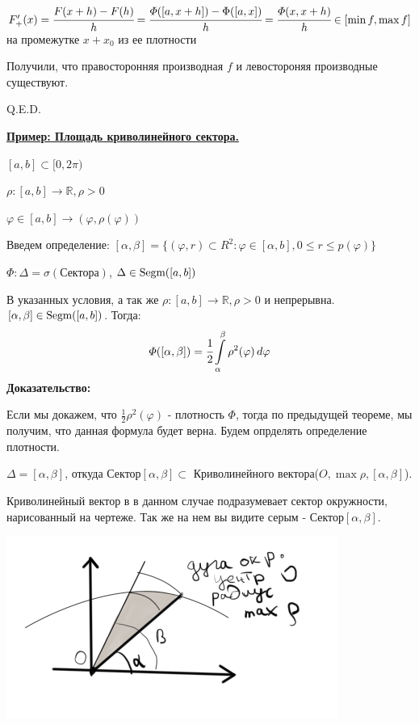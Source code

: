 $F'_{+}(x) = \cfrac{F(x+h)-F(h)}{h} = \cfrac{\varPhi([a, x +h])-\Phi([a,x])}{h} = \cfrac{\varPhi(x,x+h)}{h}\in [\min f, \max f]$ на промежутке $x+x_0$ из ее плотности  

Получили, что правосторонняя производная $f$ и левостороняя производные существуют.

\hfill Q.E.D.



\uline{\textbf{Пример: Площадь криволинейного сектора.} }

$[a,b] \subset [0,2\pi)$

$\rho:[a,b]\rightarrow \mathbb{R}, \rho>0$

$\varphi \in [a,b] \rightarrow (\varphi,\rho(\varphi))$

Введем определение:  $[\alpha,\beta] = \{(\varphi,r)\subset R^2: \varphi\in[\alpha,b], 0\leq r\leq p(\varphi)\}$

$\varPhi: \Delta = \sigma(\text{Сектора}) $, $\Delta \in \text{Segm}([a,b])$



В указанных условия, а так же $\rho: [a,b] \rightarrow \mathbb{R}, \rho>0$ и непрерывна. $[\alpha,\beta]\in \text{Segm}([a,b])$. Тогда: $$\varPhi([\alpha,\beta]) = \cfrac{1}{2}\displaystyle\int\limits_{\alpha}^{\beta}\rho^2(\varphi) \, d\varphi$$
\textbf{Доказательство:}

Если мы докажем, что $\frac{1}{2}\rho^2(\varphi)$ - плотность $\varPhi$, тогда по предыдущей теореме, мы получим, что данная формула будет верна. Будем опрделять определение плотности.

$\Delta = [\alpha,\beta]$, откуда Сектор$[\alpha,\beta]\subset$ Криволинейного вектора($O, \max \rho, [\alpha,\beta]$).

Криволинейный вектор в в данном случае подразумевает сектор окружности, нарисованный на чертеже. Так же на нем вы видите серым - Сектор$[\alpha,\beta]$.

\begin{center}
   \includegraphics[width = 10 cm]{assets/integral_3.png}
\end{center}

